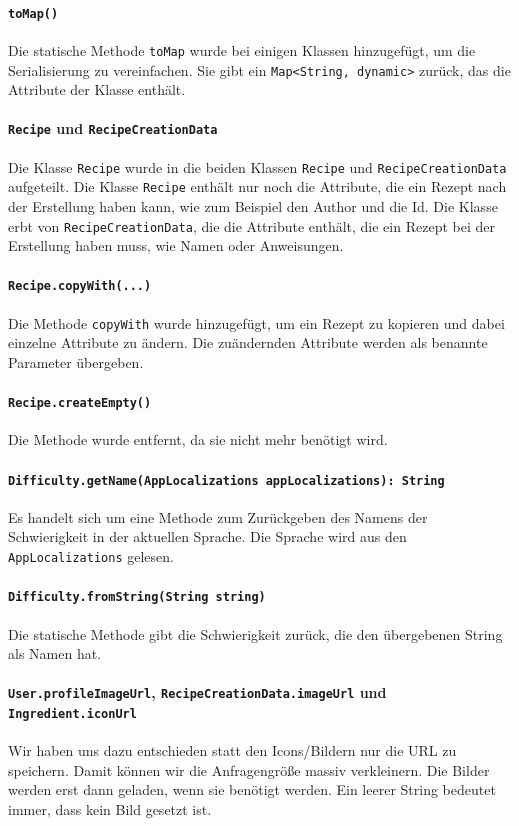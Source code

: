 \documentclass{implementierungsheft}
\begin{document}
\paragraph*{\texttt{toMap()}} Die statische Methode \texttt{toMap} wurde bei einigen Klassen hinzugefügt, um die Serialisierung zu vereinfachen. Sie gibt ein \texttt{Map<String, dynamic>} zurück, das die Attribute der Klasse enthält.
\paragraph{\texttt{Recipe} und \texttt{RecipeCreationData}}
Die Klasse \texttt{Recipe} wurde in die beiden Klassen \texttt{Recipe} und \texttt{RecipeCreationData} aufgeteilt. Die Klasse \texttt{Recipe} enthält nur noch die Attribute, die ein Rezept nach der Erstellung haben kann, wie zum Beispiel den Author und die Id. Die Klasse erbt von \texttt{RecipeCreationData}, die die Attribute enthält, die ein Rezept bei der Erstellung haben muss, wie Namen oder Anweisungen.
\paragraph{\texttt{Recipe.copyWith(...)}} Die Methode \texttt{copyWith} wurde hinzugefügt, um ein Rezept zu kopieren und dabei einzelne Attribute zu ändern. Die zuändernden Attribute werden als benannte Parameter übergeben.
\paragraph{\texttt{Recipe.createEmpty()}} Die Methode wurde entfernt, da sie nicht mehr benötigt wird.
\paragraph{\texttt{Difficulty.getName(AppLocalizations appLocalizations): String}}
Es handelt sich um eine Methode zum Zurückgeben des Namens der Schwierigkeit in der aktuellen Sprache. Die Sprache wird aus den \texttt{AppLocaliza\-tions} gelesen.
\paragraph{\texttt{Difficulty.fromString(String string)}}
Die statische Methode gibt die Schwierigkeit zurück, die den übergebenen String als Namen hat.
\paragraph{\texttt{User.profileImageUrl}, \texttt{RecipeCreationData.imageUrl} und \texttt{Ingredient.iconUrl}} Wir haben uns dazu entschieden statt den Icons/Bildern nur die URL zu speichern. Damit können wir die Anfragengröße massiv verkleinern. Die Bilder werden erst dann geladen, wenn sie benötigt werden. Ein leerer String bedeutet immer, dass kein Bild gesetzt ist.
\newpage
\end{document}
